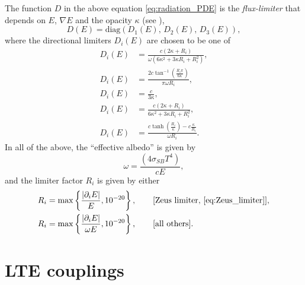 \documentclass[letterpaper,10pt]{article}
\renewcommand{\(}{\left(}
\renewcommand{\)}{\right)}
\begin{document}
The function $D$ in the above equation \eqref{eq:radiation_PDE} is
the {\em flux-limiter} that depends on $E$, $\nabla E$ and the 
opacity $\kappa$ (see
\cite{HayesNorman2003,ReynoldsHayesPaschosNorman2009}),  
\[
   D(E) = \text{diag}\( D_1(E),\, D_2(E),\, D_3(E) \),
\]
where the directional limiters $D_i(E)$ are chosen to be one of 
\begin{align}
  \label{eq:ratLP_limiter}
   D_i(E) &= \frac{c(2\kappa+R_i)}{\omega(6\kappa^2+3\kappa R_i + R_i^2)}, \\
  \label{eq:Reynolds_limiter}
   D_i(E) &= \frac{2 c \tan^{-1}\left(\frac{R_i \pi}{6 \kappa}\right)}{\pi
     \omega R_i},  \\
  \label{eq:no_limiter}
   D_i(E) &= \frac{c}{3\kappa}, \\
  \label{eq:Zeus_limiter}
   D_i(E) &= \frac{c(2\kappa+R_i)}{6\kappa^2+3\kappa R_i+R_i^2}, \\
  \label{eq:LP_limiter}
   D_i(E) &= \frac{c \tanh\left(\frac{R_i}{\kappa}\right)-c \frac{\kappa}{R_i}}{\omega R_i}.
\end{align}
In all of the above, the ``effective albedo'' is given by
\begin{equation}
\label{eq:albedo}
  \omega = \frac{(4 \sigma_{SB} T^4)}{c E},
\end{equation}
and the limiter factor $R_i$ is given by either
\begin{align}
  \label{eq:R_zeus}
   R_i &= \max\left\{\frac{|\partial_i E|}{E}, 10^{-20}\right\},
     \qquad\text{[Zeus limiter, 
     \eqref{eq:Zeus_limiter}]},\\ 
   R_i &= \max\left\{\frac{|\partial_i E|}{\omega E},
     10^{-20}\right\}, \qquad\text{[all others]}. 
\end{align}



\section{LTE couplings}
\label{sec:lte_model}
\end{document}
